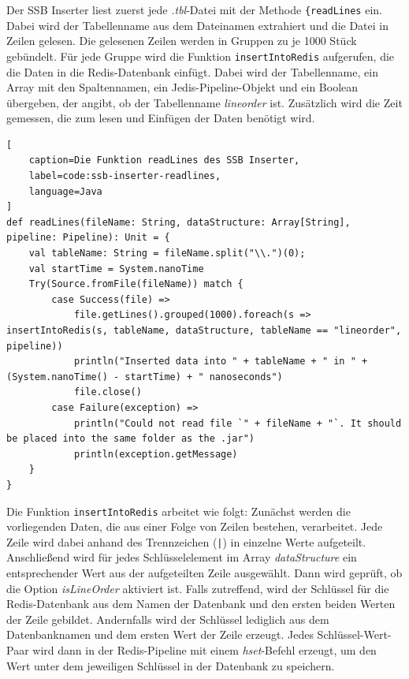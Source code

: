 Der SSB Inserter liest zuerst jede \emph{.tbl}-Datei mit der Methode \lstinline|{readLines| ein. Dabei wird der Tabellenname aus dem Dateinamen extrahiert und die Datei in Zeilen gelesen. Die gelesenen Zeilen werden in Gruppen zu je 1000 Stück gebündelt. Für jede Gruppe wird die Funktion \lstinline|insertIntoRedis| aufgerufen, die die Daten in die Redis-Datenbank einfügt. Dabei wird der Tabellenname, ein Array mit den Spaltennamen, ein Jedis-Pipeline-Objekt und ein Boolean übergeben, der angibt, ob der Tabellenname \emph{lineorder} ist.
Zusätzlich wird die Zeit gemessen, die zum lesen und Einfügen der Daten benötigt wird.

\begin{lstlisting}[
    caption=Die Funktion readLines des SSB Inserter,
    label=code:ssb-inserter-readlines,
    language=Java
]
def readLines(fileName: String, dataStructure: Array[String], pipeline: Pipeline): Unit = {
	val tableName: String = fileName.split("\\.")(0);
	val startTime = System.nanoTime
	Try(Source.fromFile(fileName)) match {
		case Success(file) =>
			file.getLines().grouped(1000).foreach(s => insertIntoRedis(s, tableName, dataStructure, tableName == "lineorder", pipeline))
			println("Inserted data into " + tableName + " in " + (System.nanoTime() - startTime) + " nanoseconds")
			file.close()
		case Failure(exception) =>
			println("Could not read file `" + fileName + "`. It should be placed into the same folder as the .jar")
			println(exception.getMessage)
	}
}
\end{lstlisting}

Die Funktion \lstinline|insertIntoRedis| arbeitet wie folgt: Zunächst werden die vorliegenden Daten, die aus einer Folge von Zeilen bestehen, verarbeitet. Jede Zeile wird dabei anhand des Trennzeichen (\lstinline+|+) in einzelne Werte aufgeteilt. Anschließend wird für jedes Schlüsselelement im Array \emph{dataStructure} ein entsprechender Wert aus der aufgeteilten Zeile ausgewählt. Dann wird geprüft, ob die Option \emph{isLineOrder} aktiviert ist. Falls zutreffend, wird der Schlüssel für die Redis-Datenbank aus dem Namen der Datenbank und den ersten beiden Werten der Zeile gebildet. Andernfalls wird der Schlüssel lediglich aus dem Datenbanknamen und dem ersten Wert der Zeile erzeugt. Jedes Schlüssel-Wert-Paar wird dann in der Redis-Pipeline mit einem \emph{hset}-Befehl erzeugt, um den Wert unter dem jeweiligen Schlüssel in der Datenbank zu speichern.

